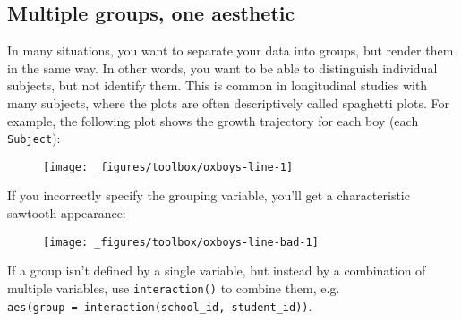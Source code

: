\hypertarget{multiple-groups-one-aesthetic}{%
\subsection{Multiple groups, one
aesthetic}\label{multiple-groups-one-aesthetic}}

In many situations, you want to separate your data into groups, but
render them in the same way. In other words, you want to be able to
distinguish individual subjects, but not identify them. This is common
in longitudinal studies with many subjects, where the plots are often
descriptively called spaghetti plots. For example, the following plot
shows the growth trajectory for each boy (each \texttt{Subject}):
 

\begin{Shaded}
\begin{Highlighting}[]
\OperatorTok{+}\StringTok{ }
\StringTok{  }\NormalTok{() }\OperatorTok{+}\StringTok{ }
\StringTok{  }\NormalTok{()}
\end{Highlighting}
\end{Shaded}

\begin{figure}[H]
  \centering
  \texttt{[image: \_figures/toolbox/oxboys-line-1]}
\end{figure}

If you incorrectly specify the grouping variable, you'll get a
characteristic sawtooth appearance:

\begin{Shaded}
\begin{Highlighting}[]
\OperatorTok{+}\StringTok{ }
\StringTok{  }\NormalTok{() }\OperatorTok{+}\StringTok{ }
\StringTok{  }\NormalTok{()}
\end{Highlighting}
\end{Shaded}

\begin{figure}[H]
  \centering
  \texttt{[image: \_figures/toolbox/oxboys-line-bad-1]}
\end{figure}

If a group isn't defined by a single variable, but instead by a
combination of multiple variables, use \texttt{interaction()} to combine
them, e.g.
\texttt{aes(group\ =\ interaction(school\_id,\ student\_id))}.

